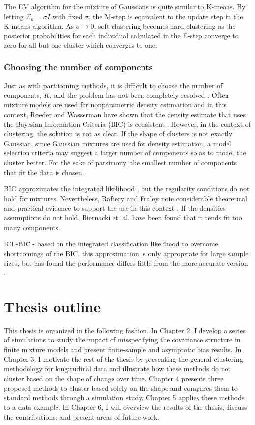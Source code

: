 The EM algorithm for the mixture of Gaussians is quite similar to K-means. By letting $\Sigma_{k} =\sigma I$ with fixed $\sigma$, the M-step is equivalent to the update step in the K-means algorithm. As $\sigma\rightarrow 0$, soft clustering becomes hard clustering as the posterior probabilities for each individual calculated in the E-step converge to zero for all but one cluster which converges to one. 

\subsubsection{Choosing the number of components}
Just as with partitioning methods, it is difficult to choose the number of components, $K$, and the problem has not been completely resolved \cite{mclachlan2000}. Often mixture models are used for nonparametric density estimation and in this context, Roeder and Wasserman have shown that the density estimate that uses the Bayesian Information Criteria (BIC) is consistent \cite{roeder1997}. However, in the context of clustering, the solution is not as clear. If the shape of clusters is not exactly Gaussian, since Gaussian mixtures are used for density estimation, a model selection criteria may suggest a larger number of components so as to model the cluster better. For the sake of parsimony, the smallest number of components that fit the data is chosen.

BIC approximates the integrated likelihood \cite{schwarz1978}, but the regularity conditions do not hold for mixtures. Nevertheless, Raftery and Fraley note considerable theoretical and practical evidence to support the use in this context \cite{fraley1998}. If the densities assumptions do not hold, Biernacki et. al. \cite{biernacki2000} have been found that it tends fit too many components. 

ICL-BIC - based on the integrated classification likelihood to overcome shortcomings of the BIC. this approximation is only appropriate for large sample sizes, but has found the performance differs little from the more accurate version \cite{biernacki2000}.

\section{Thesis outline}
This thesis is organized in the following fashion. In Chapter 2, I develop a series of simulations to study the impact of misspecifying the covariance structure in finite mixture models and present finite-sample and asymptotic bias results. In Chapter 3, I motivate the rest of the thesis by presenting the general clustering methodology for longitudinal data and illustrate how these methods do not cluster based on the shape of change over time. Chapter 4 presents three proposed methods to cluster based solely on the shape and compares them to standard methods through a simulation study. Chapter 5 applies these methods to a data example. In Chapter 6, I will overview the results of the thesis, discuss the contributions, and present areas of future work. 

